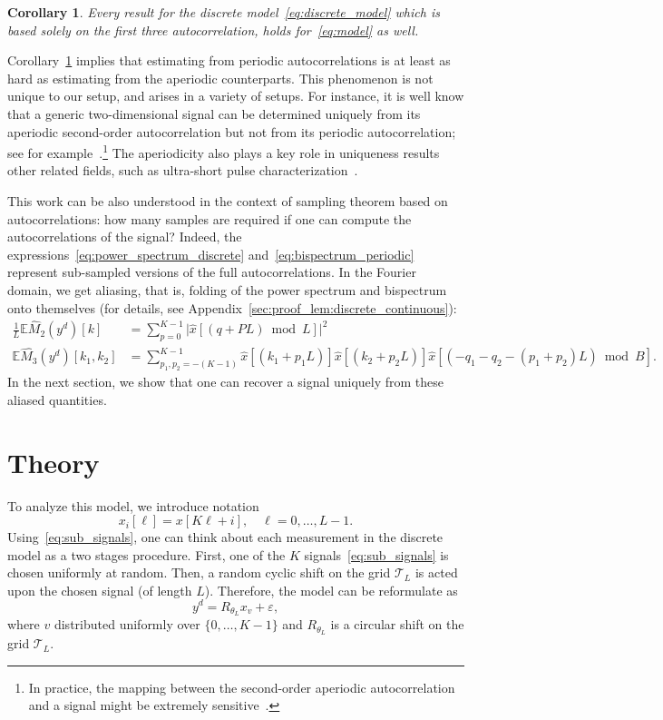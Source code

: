 \documentclass[english,12pt]{article}
\newcommand{\E}{\mathbb{E}}
\newcommand{\T}{\mathcal{T}}
\numberwithin{equation}{section}
\numberwithin{thm}{section} %
\newtheorem{cor}[thm]{Corollary}
\begin{document}
\begin{cor} \label{cor:discrete_contonuous}
	Every result for the discrete model~\eqref{eq:discrete_model} which is based solely on the first three autocorrelation, holds for~\eqref{eq:model} as well.
\end{cor}


Corollary~\ref{cor:discrete_contonuous} implies that estimating from  periodic autocorrelations is at least as hard as estimating from the aperiodic counterparts.
This phenomenon is not unique to our setup, and arises in a variety of setups.  
For instance, it is well know that a generic two-dimensional signal can be determined uniquely from its aperiodic second-order autocorrelation but not from its periodic autocorrelation; see for example~\cite{hayes1982reconstruction}.\footnote{In practice, the mapping between the second-order aperiodic autocorrelation and a signal might be extremely sensitive~\cite{barnett2018geometry}.} The aperiodicity also plays a key role in uniqueness results other related fields, such as ultra-short pulse characterization~\cite{bendory2018signal}. 

This work can be also understood in the context of sampling theorem based on autocorrelations: how many samples are required if one can compute the autocorrelations of the signal?
 Indeed, the expressions~\eqref{eq:power_spectrum_discrete} and~\eqref{eq:bispectrum_periodic} represent sub-sampled versions of the full autocorrelations. In the Fourier domain, we get aliasing, that is, folding of the power spectrum and bispectrum onto themselves (for details, see Appendix~\ref{sec:proof_lem:discrete_continuous}):
\begin{align}
\frac{1}{L}\E \hat{M}_2(y^d)[k] &=  \sum_{p=0}^{K-1} \vert \hat{x}[(q+PL)\bmod L]\vert^2 \\
\E \hat{M_3}(y^d)[k_1,k_2] &=  
 \sum_{p_1,p_2=-(K-1)}^{K-1} \hat{x}[(k_1 + p_1L)] \hat{x}[(k_2 + p_2L)]\hat{x}[(-q_1-q_2 - (p_1+p_2)L)\bmod B]. \nonumber
\end{align}
In the next section, we show that one can recover a signal uniquely from these aliased quantities. 

\section{Theory}
\label{sec:theory}
To analyze this model, we introduce notation
\begin{equation} \label{eq:sub_signals}
x_i[\ell] = x[K\ell + i], \quad \ell=0,\ldots,L-1.
\end{equation}
Using~\eqref{eq:sub_signals}, one can think about each measurement in the discrete model 
as a two stages procedure. First, one of the $K$ signals~\eqref{eq:sub_signals} is chosen uniformly at random. Then, a random cyclic shift on the grid $\T_L$ is acted upon the chosen signal (of length $L$).
Therefore, the model can be reformulate  as 
\begin{equation} \label{eq:heter_mra}
y^d =  R_{\theta_{L}} x_{v} + \varepsilon,
\end{equation}
where $v$ distributed uniformly over $\{0,\ldots,K-1\}$ and $R_{\theta_L}$ is a circular shift on the grid $\T_L$. 
\end{document}
